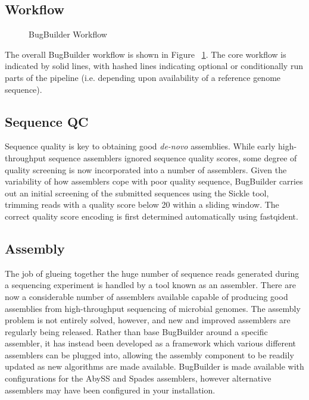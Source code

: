 \documentclass[a4paper,10pt]{article}
\begin{document}
\subsection{Workflow}

\begin{figure}[ht]
\caption{BugBuilder Workflow}
\label{fig:BugBuilderWorkflow}
\end{figure}

The overall BugBuilder workflow is shown in Figure ~\ref{fig:BugBuilderWorkflow}. The core workflow
is indicated by solid lines, with hashed lines indicating optional or conditionally run parts of
the pipeline (i.e. depending upon availability of a reference genome sequence). 

\subsection{Sequence QC}

Sequence quality is key to obtaining good \textit{de-novo} assemblies. While early high-throughput
sequence assemblers ignored sequence quality scores, some degree of quality screening is now
incorporated into a number of assemblers. Given the variability of how assemblers cope with poor
quality sequence, BugBuilder carries out an initial screening of the submitted sequences using
the Sickle tool, trimming reads with a quality score below 20 within a sliding window. The correct
quality score encoding is first determined automatically using fastqident.

\subsection{Assembly}

The job of glueing together the huge number of sequence reads generated during a sequencing
experiment is handled by a tool known as an assembler. There are now a considerable number of
assemblers available capable of producing good assemblies from high-throughput sequencing of
microbial genomes. The assembly problem is not entirely solved, however, and new and improved
assemblers are regularly being released. Rather than base BugBuilder around a specific assembler,
it has instead been developed as a framework which various different assemblers can be plugged
into, allowing the assembly component to be readily updated as new algorithms are made available.
BugBuilder is made available with configurations for the AbySS and Spades assemblers, however
alternative assemblers may have been configured in your installation.
\end{document}
